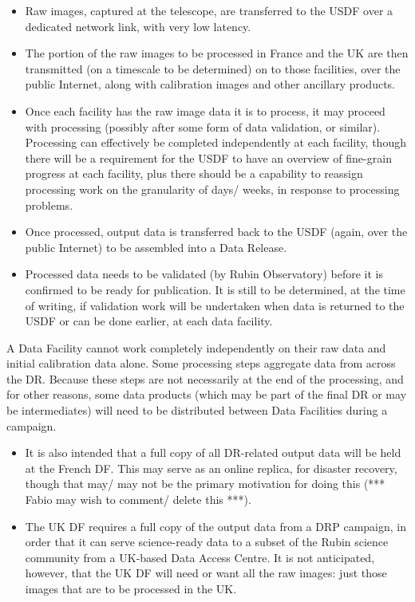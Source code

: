 \begin{itemize}

  \item Raw images, captured at the telescope, are transferred to the USDF over a dedicated network link, with very low latency.

  \item The portion of the raw images to be processed in France and the UK are then transmitted (on a timescale to be determined) on to those facilities, over the public Internet, along with calibration images and other ancillary products.

  \item Once each facility has the raw image data it is to process, it may proceed with processing (possibly after some form of data validation, or similar). Processing can effectively be completed independently at each facility, though there will be a requirement for the USDF to have an overview of fine-grain progress at each facility, plus there should be a capability to reassign processing work on the granularity of days/ weeks, in response to processing problems.

  \item Once processed, output data is transferred back to the USDF (again, over the public Internet) to be assembled into a Data Release.

  \item Processed data needs to be validated (by Rubin Observatory) before it is confirmed to be ready for publication. It is still to be determined, at the time of writing, if validation work will be undertaken when data is returned to the USDF or can be done earlier, at each data facility.
    
\end{itemize}

A Data Facility cannot work completely independently on their raw data and initial calibration data alone. Some processing steps aggregate data from across the DR. Because these steps are not necessarily at the end of the processing, and for other reasons, some data products (which may be part of the final DR or may be intermediates) will need to be distributed between Data Facilities during a campaign.

\begin{itemize}

  \item It is also intended that a full copy of all DR-related output data will be held at the French DF. This may serve as an online replica, for disaster recovery, though that may/ may not be the primary motivation for doing this (*** Fabio may wish to comment/ delete this ***).

  \item The UK DF requires a full copy of the output data from a DRP campaign, in order that it can serve science-ready data to a subset of the Rubin science community from a UK-based Data Access Centre. It is not anticipated, however, that the UK DF will need or want all the raw images: just those images that are to be processed in the UK.
    
\end{itemize}

